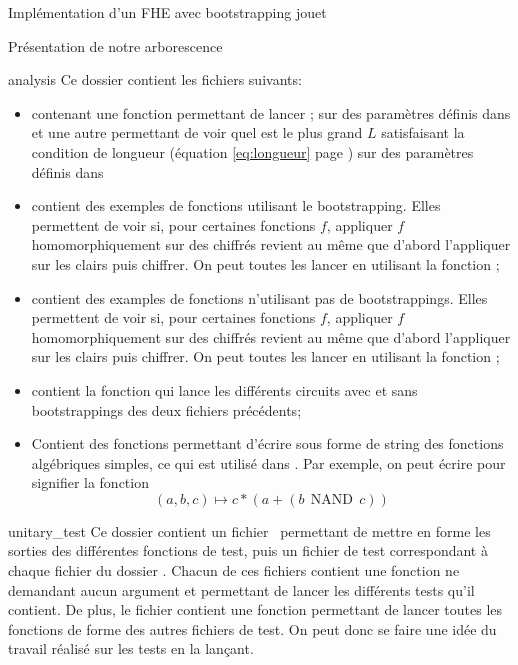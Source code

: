 \begin{section}{Implémentation d'un FHE avec bootstrapping \og{}jouet\fg~{}}
\begin{subsection}{Présentation de notre arborescence}
\begin{subsubsection}{analysis}
Ce dossier contient les fichiers suivants:
\begin{itemize}
\item {} contenant une fonction permettant de lancer ;
 sur des paramètres définis dans  et une autre permettant de voir quel est le plus grand $L$
 satisfaisant la condition de longueur (équation \eqref{eq:longueur} page \pageref{eq:longueur}) sur des paramètres
 définis dans 
\item {} contient des exemples de fonctions utilisant le bootstrapping. Elles
permettent de voir si, pour certaines fonctions $f$, appliquer $f$ homomorphiquement sur des chiffrés revient au même
que d'abord l'appliquer sur les clairs puis chiffrer.  On peut toutes les lancer en  utilisant  la fonction
;
\item {} contient des examples de fonctions n'utilisant pas de bootstrappings.
Elles permettent de voir si, pour certaines fonctions $f$, appliquer $f$
homomorphiquement sur des chiffrés revient au même que d'abord l'appliquer sur les clairs puis chiffrer.  On peut toutes
les lancer en  utilisant  la fonction ;
\item {} contient la fonction  qui lance les différents circuits avec
et sans bootstrappings des deux fichiers précédents;
\item {} Contient des fonctions permettant d'écrire sous forme de string des fonctions algébriques
simples, ce qui est utilisé dans  . Par exemple, on peut écrire
 pour signifier la fonction \[(a,b,c) \mapsto c * (a + (b\:\: \text{NAND}\:\: c)) \]
\end{itemize}
\end{subsubsection} %

\begin{subsubsection}{unitary\_test}
Ce dossier contient un fichier  permettant de mettre en forme les sorties des différentes
fonctions de test, puis un fichier de test correspondant à chaque fichier du dossier .  Chacun de ces
fichiers contient une fonction  ne demandant aucun argument et permettant de lancer les différents
tests qu'il contient. De plus, le fichier  contient une fonction  permettant de
lancer toutes les fonctions de forme  des autres fichiers de test.  On peut donc se faire une idée
du travail réalisé sur les tests en la lançant.
\end{subsubsection} %
\end{subsection}
\end{section}
